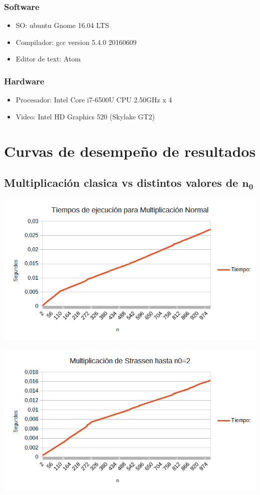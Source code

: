 \documentclass[12pt,letterpaper]{scrartcl}
\begin{document}
\subsubsection{Software}
\begin{itemize}
\item  SO: ubuntu Gnome 16.04 LTS
\item Compilador: gcc version 5.4.0 20160609
\item Editor de text: Atom
\end{itemize}

\subsubsection{Hardware}
\begin{itemize}
\item Procesador: Intel Core i7-6500U CPU  2.50GHz x 4
\item Video: Intel HD Graphics 520 (Skylake GT2)
\end{itemize}
\newpage



\section{Curvas de desempeño de resultados}

\subsection{Multiplicación clasica vs distintos valores de $\mathbf{n_0}$}
\includegraphics[scale=0.6]{normal.png} 

\includegraphics[scale=0.6]{n0-2.png} 
\end{document}

